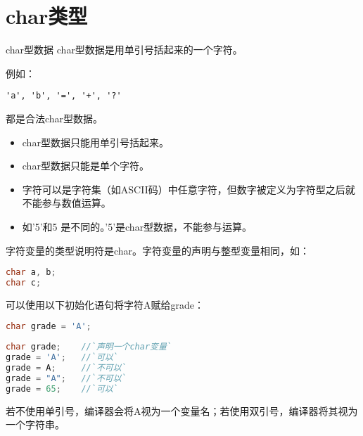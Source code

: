\section{char类型}
\begin{frame}[fragile]\ft{\secname}
\begin{dingyi} \textcolor{acolor3}{char型数据}
char型数据是用单引号括起来的一个字符。
\end{dingyi}
例如：
\begin{lstlisting}
'a', 'b', '=', '+', '?'
\end{lstlisting}
都是合法char型数据。
\end{frame}

\begin{frame}
\begin{itemize}
\item char型数据只能用单引号括起来。\\[0.1in]
\item char型数据只能是单个字符。\\[0.1in]
\item 字符可以是字符集（如ASCII码）中任意字符，但数字被定义为字符型之后就不能参与数值运算。\\[0.1in]
\item[] 如'5'和5 是不同的。'5'是char型数据，不能参与运算。
\end{itemize}
\end{frame}

\begin{frame}[fragile]
字符变量的类型说明符是char。字符变量的声明与整型变量相同，如：
\begin{lstlisting}[language=C]
char a, b;
char c;
\end{lstlisting}

\end{frame}

\begin{frame}[fragile]
可以使用以下初始化语句将字符A赋给grade：
\begin{lstlisting}[language=C]
char grade = 'A';
\end{lstlisting}

\end{frame}

\begin{frame}[fragile]

\begin{lstlisting}[language=C]
char grade;    //`声明一个char变量`
grade = 'A';   //`可以`
grade = A;     //`不可以`
grade = "A";   //`不可以`
grade = 65;    //`可以` 
\end{lstlisting}
若不使用单引号，编译器会将A视为一个变量名；若使用双引号，编译器将其视为一个字符串。
\end{frame}

